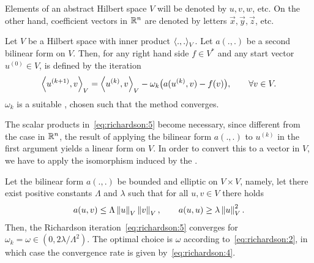 \begin{intro}
  Elements of an abstract Hilbert space $V$ will be denoted by
  $u,v,w$, etc. On the other hand, coefficient vectors in $\mathbb R^n$ are
  denoted by letters $\vec x,\vec y,\vec z$, etc.
\end{intro}

\begin{definition}
  Let $V$ be a Hilbert space with inner product $\scal(.,.)_V$. Let
  $a(.,.)$ be a second bilinear form on $V$. Then, for any right hand
  side $f\in V^*$ and any start vector $u^{(0)}\in V$,
   is defined by the iteration
  \begin{gather}
    \label{eq:richardson:5}
    \scal(u^{(k+1)},v)_V = \scal(u^{(k)},v)_V
    - \omega_k \bigl(a(u^{(k)},v) - f(v)\bigr), \qquad \forall v\in V.
  \end{gather}
  $\omega_k$ is a suitable , chosen
  such that the method converges.
\end{definition}

\begin{note}
  The scalar products in~\eqref{eq:richardson:5} become necessary,
  since different from the case in $\mathbb R^n$, the result of applying the
  bilinear form $a(.,.)$ to $u^{(k)}$ in the first argument yields a
  linear form on $V$. In order to convert this to a vector in $V$, we
  have to apply the isomorphism induced by the .
\end{note}

\begin{theorem}
  \label{theorem:richardson:1}
  Let the bilinear form $a(.,.)$ be bounded and elliptic on $V\times
  V$, namely, let there exist positive constants $\Lambda$ and $\lambda$ such
  that for all $u,v\in V$ there holds
  \begin{gather}
    \label{eq:richardson:6}
    a(u,v) \le \Lambda \left\|u\right\|_V \left\|v\right\|_V,
    \qquad
    a(u,u) \ge \lambda \left\|u\right\|_V^2.
  \end{gather}
  Then, the Richardson iteration~\eqref{eq:richardson:5} converges for
  $\omega_k = \omega \in (0, 2 \lambda/\Lambda^2)$. The optimal
  choice is $\omega$ according to~\eqref{eq:richardson:2}, in which
  case the convergence rate is given by~\eqref{eq:richardson:4}.
\end{theorem}

